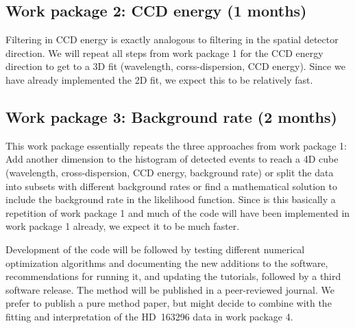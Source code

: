 \documentclass[fleqn,12pt,onecolumn]{SelfArx} %
\begin{document}
\subsection{Work package 2: CCD energy (1 months)}
Filtering in CCD energy is exactly analogous to filtering in the spatial detector direction. We will repeat all steps from work package 1 for the CCD energy direction to get to a 3D fit (wavelength, corss-dispersion, CCD energy). Since we have already implemented the 2D fit, we expect this to be relatively fast.


\subsection{Work package 3: Background rate (2 months)}
This work package essentially repeats the three approaches from work package 1: Add another dimension to the histogram of detected events to reach a 4D cube (wavelength, cross-dispersion, CCD energy, background rate) or split the data into subsets with different background rates or find a mathematical solution to include the background rate in the likelihood function. Since is this basically a repetition of work package 1 and much of the code will have been implemented in work package 1 already, we expect it to be much faster.

Development of the code will be followed by testing different numerical optimization algorithms and documenting the new additions to the software, recommendations for running it, and updating the tutorials, followed by a third software release.
The method will be published in a peer-reviewed journal. We prefer to publish a pure method paper, but might decide to combine with the fitting and interpretation of the HD~163296 data in work package 4.

\end{document}
